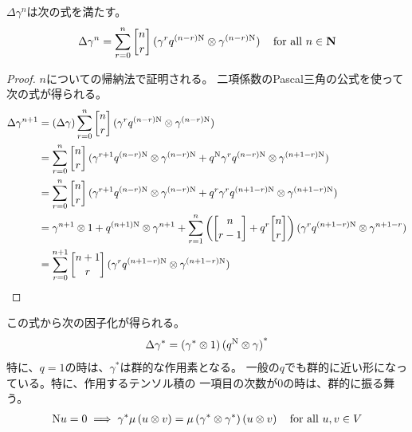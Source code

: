{	$\Delta\gamma^n$は次の式を満たす。
	\begin{equation*}\begin{split}
		\Delta\gamma^n = \sum_{r=0}^n\qbinom{n}{r}
			\plr{\gamma^rq^{\plr{n-r}\opN}\otimes\gamma^{\plr{n-r}\opN}} 
			\quad\text{for all } n\in\sizen
	\end{split}\end{equation*}
	\begin{proof} %
		$n$についての帰納法で証明される。
		二項係数のPascal三角の公式を使って次の式が得られる。
		\begin{equation*}\begin{split}
			\Delta\gamma^{n+1} &= \plr{\Delta\gamma}
				\sum_{r=0}^n\qbinom{n}{r}\plr{\gamma^rq^{\plr{n-r}\opN}
				\otimes\gamma^{\plr{n-r}\opN}} \\
			&= \sum_{r=0}^n\qbinom{n}{r}\plr{\gamma^{r+1}q^{\plr{n-r}\opN}
				\otimes\gamma^{\plr{n-r}\opN} + q^{\opN}\gamma^rq^{\plr{n-r}\opN}
				\otimes\gamma^{\plr{n+1-r}\opN}} \\
			&= \sum_{r=0}^n\qbinom{n}{r}\plr{\gamma^{r+1}q^{\plr{n-r}\opN}
				\otimes\gamma^{\plr{n-r}\opN} + q^r\gamma^rq^{\plr{n+1-r}\opN}
				\otimes\gamma^{\plr{n+1-r}\opN}} \\
			&= \gamma^{n+1}\otimes1 + q^{\plr{n+1}\opN}\otimes\gamma^{n+1}
				+ \sum_{r=1}^n\plra{\qbinom{n}{r-1} + q^r\qbinom{n}{r}}
				\plr{\gamma^rq^{\plr{n+1-r}\opN}\otimes\gamma^{n+1-r}} \\
			&= \sum_{r=0}^{n+1}\qbinom{n+1}{r}\plr{\gamma^rq^{\plr{n+1-r}\opN}
				\otimes\gamma^{\plr{n+1-r}\opN}}
		\end{split}\end{equation*}
	\end{proof} %
	この式から次の因子化が得られる。
	\begin{equation*}\begin{split}
		\Delta\gamma^* = \mathinner{({\gamma^*\otimes1})}\mathinner{({q^{\mathinner{\operatorname{N}}}\otimes\gamma})}^*
	\end{split}\end{equation*}
	特に、$q=1$の時は、$\gamma^*$は群的な作用素となる。
	一般の$q$でも群的に近い形になっている。特に、作用するテンソル積の
	一項目の次数が$0$の時は、群的に振る舞う。
	\begin{equation*}\begin{split}
		{\mathinner{\operatorname{N}}} u = 0 \implies \gamma^*\mu\mathinner{({u\otimes v})}
		= \mu\mathinner{({\gamma^*\otimes\gamma^*})}\mathinner{({u\otimes v})}
		\quad\text{for all } u,v\in V
	\end{split}\end{equation*}

}
